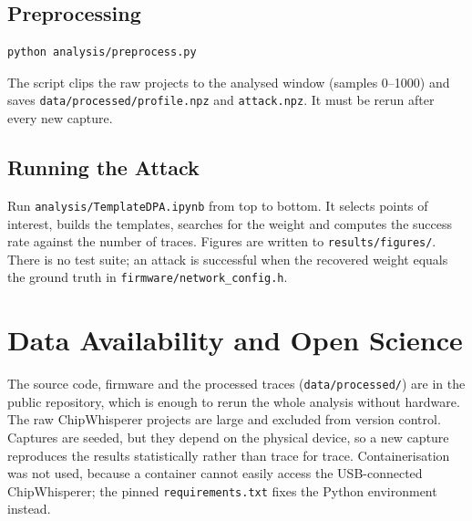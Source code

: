 \subsection{Preprocessing}

\begin{verbatim}
python analysis/preprocess.py
\end{verbatim}
The script clips the raw projects to the analysed window (samples 0--1000) and saves \texttt{data/processed/profile.npz} and \texttt{attack.npz}.
It must be rerun after every new capture.

\subsection{Running the Attack}

Run \texttt{analysis/TemplateDPA.ipynb} from top to bottom.
It selects points of interest, builds the templates, searches for the weight and computes the success rate against the number of traces.
Figures are written to \texttt{results/figures/}.
There is no test suite; an attack is successful when the recovered weight equals the ground truth in \texttt{firmware/network\_config.h}.

\section{Data Availability and Open Science}

The source code, firmware and the processed traces (\texttt{data/processed/}) are in the public repository, which is enough to rerun the whole analysis without hardware.
The raw ChipWhisperer projects are large and excluded from version control.
Captures are seeded, but they depend on the physical device, so a new capture reproduces the results statistically rather than trace for trace.
Containerisation was not used, because a container cannot easily access the USB-connected ChipWhisperer; the pinned \texttt{requirements.txt} fixes the Python environment instead.
